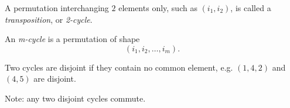 \begin{definition}[Transposition]
	A permutation interchanging $2$ elements only, such as $(i_1,i_2)$, is called a \textit{transposition}, or \textit{2-cycle}.

	An \textit{m-cycle} is a permutation of shape \[
		\left( i_1,i_2,\ldots,i_m \right) 
	.\] 
\end{definition}

Two cycles are disjoint if they contain no common element, e.g. $(1,4,2)$ and $(4,5)$ are disjoint.

Note: any two disjoint cycles commute.
